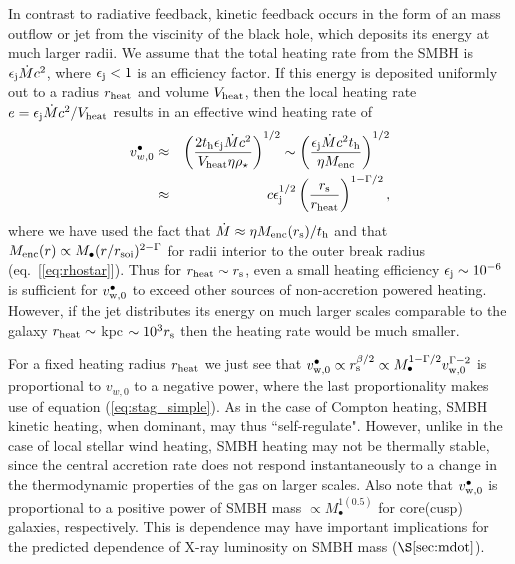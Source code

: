 \documentclass[usenatbib,fleqn]{mn2e}
\begin{document}
In contrast to radiative feedback, kinetic feedback occurs in the form
of an mass outflow or jet from the viscinity of the black hole, which
deposits its energy at much larger radii.  We assume that the total
heating rate from the SMBH is $\epsilon_{\rm j} \dot{M}c^{2}$, where
$\epsilon_{\rm j} < 1$ is an efficiency factor.  If this energy is
deposited uniformly out to a radius $r_{\rm heat}$ and volume $V_{\rm
heat}$, then the local heating rate $e = \epsilon_{\rm
j}\dot{M}c^{2}/V_{\rm heat}$ results in an effective wind heating rate
of
\begin{eqnarray} v_{w,0}^{\bullet} &\approx& \left(\frac{2t_{\rm
h}\epsilon_{\rm j}\dot{M}c^{2}}{V_{\rm heat}\eta
\rho_{\star}}\right)^{1/2} \sim \left(\frac{\epsilon_{\rm
j}\dot{M}c^{2}t_{\rm h}}{\eta M_{\rm enc}}\right)^{1/2} \nonumber \\
&\approx& c\epsilon_{\rm j}^{1/2}\left(\frac{r_{\rm s}}{r_{\rm
heat}}\right)^{1-\Gamma/2},
\end{eqnarray} where we have used the fact that $\dot{M} \approx \eta
M_{\rm enc}(r_{\rm s})/t_{\rm h}$ and that $M_{\rm enc}(r) \propto
M_{\bullet}(r/r_{\rm soi})^{2-\Gamma}$ for radii interior to the outer
break radius (eq.~[\ref{eq:rhostar}]).  Thus for $r_{\rm heat} \sim
r_{\rm s}$, even a small heating efficiency $\epsilon_{\rm j} \sim
10^{-6}$ is sufficient for $v_{\rm w,0}^{\bullet}$ to exceed other
sources of non-accretion powered heating.  However, if the jet
distributes its energy on much larger scales comparable to the galaxy
$r_{\rm heat} \sim $ kpc $\sim 10^{3}r_{\rm s}$ then the heating rate
would be much smaller.

For a fixed heating radius $r_{\rm heat}$ we just see that $v_{\rm
  w,0}^{\bullet} \propto r_{\rm s}^{\beta/2} \propto
M_{\bullet}^{1-\Gamma/2}v_{\rm w,0}^{\Gamma-2}$ is proportional to
$v_{w,0}$ to a negative power, where the last proportionality makes
use of equation (\ref{eq:stag_simple}).  As in the case of Compton
heating, SMBH kinetic heating, when dominant, may thus
``self-regulate".  However, unlike in the case of local stellar wind
heating, SMBH heating may not be thermally stable, since the central
accretion rate does not respond instantaneously to a change in the
thermodynamic properties of the gas on larger scales.  Also note that
$v_{\rm w,0}^{\bullet}$ is proportional to a positive power of SMBH
mass $\propto M_{\bullet}^{1(0.5)}$ for core(cusp) galaxies,
respectively.  This is dependence may have important implications for
the predicted dependence of X-ray luminosity on SMBH mass
($\S\ref{sec:mdot}$).
\end{document}
